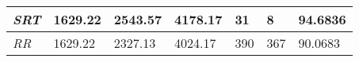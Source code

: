 \documentclass{article}
\begin{document}
\begin{table}[h!]
\begin{tabular}{|l|l|l|l|l|l|l|}
  \textit{SRT}       & 1629.22                                                                          & 2543.57                                                                     & 4178.17                                                                            & 31                                                                                    & 8                                                                                   & 94.6836                                                                    \\ \hline
  \textit{RR}        & 1629.22                                                                          & 2327.13                                                                     & 4024.17                                                                            & 390                                                                                   & 367                                                                                 & 90.0683                                                                    \\ \hline
  \end{tabular}
  \label{table:7}
\end{table}
\end{document}
